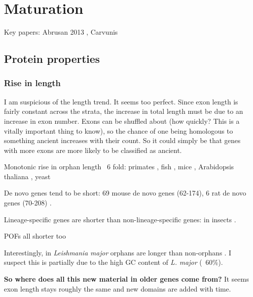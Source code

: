 \section{Maturation}

Key papers: Abrusan 2013 \cite{abrusan_integration_2013}, Carvunis
\cite{carvunis_proto-genes_2012}

\subsection{Protein properties}
    \subsubsection{Rise in length} 

        I am suspicious of the length trend. It seems too perfect.  Since
        exon length is fairly constant across the strata, the increase in
        total length must be due to an increase in exon number. Exons can
        be shuffled about (how quickly? This is a vitally important thing
        to know), so the chance of one being homologous to something
        ancient increases with their count. So it could simply be that
        genes with more exons are more likely to be classified as ancient.
                
        Monotonic rise in orphan length ~6 fold: primates
        \cite{neme_phylogenetic_2013, toll-riera_origin_2009}, fish
        \cite{neme_phylogenetic_2013}, mice \cite{neme_phylogenetic_2013},
        Arabidopsis thaliana \cite{guo_gene_2013}, yeast
        \cite{carvunis_proto-genes_2012}

        De novo genes tend to be short: 69 mouse de novo genes (62-174), 6 rat
        de novo genes (70-208) \cite{murphy_novo_2012}.
        
        Lineage-specific genes are shorter than non-lineage-specific genes: in
        insects \cite{wissler_mechanisms_2013}.

        POFs all shorter too \cite{gollery_what_2006} 

        Interestingly, in \textit{Leishmania major} orphans are longer than
        non-orphans \cite{mukherjee_elucidating_2015}. I suspect this is
        partially due to the high GC content of \textit{L. major} (~60\%).

        \textbf{So where does all this new material in older genes come from?}
        It seems exon length stays roughly the same and new domains are added
        with time.

